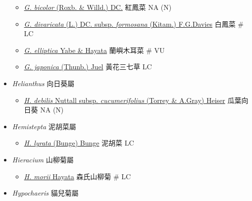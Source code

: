 \begin{itemize}
  \begin{itemize}
        \item[] \href{http://www.theplantlist.org/tpl1.1/search?q=Gynura+bicolor}{\textit{G. bicolor} (Roxb. \& Willd.) DC.}   紅鳳菜   NA (N)
        \item[] \href{http://www.theplantlist.org/tpl1.1/search?q=Gynura+divaricata+subsp.+formosana}{\textit{G. divaricata} (L.) DC. subsp. \textit{formosana} (Kitam.) F.G.Davies}   白鳳菜  \# LC
        \item[] \href{http://www.theplantlist.org/tpl1.1/search?q=Gynura+elliptica}{\textit{G. elliptica} Yabe \& Hayata}   蘭嶼木耳菜  \# VU
        \item[] \href{http://www.theplantlist.org/tpl1.1/search?q=Gynura+japonica}{\textit{G. japonica} (Thunb.) Juel}   黃花三七草   LC
  \end{itemize}
 \item[] \textit{Helianthus} 向日葵屬
                                
  \begin{itemize}
        \item[] \href{http://www.theplantlist.org/tpl1.1/search?q=Helianthus+debilis+subsp.+cucumerifolius}{\textit{H. debilis} Nuttall subsp. \textit{cucumerifolius} (Torrey \& A.Gray) Heiser}   瓜葉向日葵   NA (N)
  \end{itemize}
 \item[] \textit{Hemistepta} 泥胡菜屬
                                
  \begin{itemize}
        \item[] \href{http://www.theplantlist.org/tpl1.1/search?q=Hemistepta+lyrata}{\textit{H. lyrata} (Bunge) Bunge}   泥胡菜   LC
  \end{itemize}
 \item[] \textit{Hieracium} 山柳菊屬
                                
  \begin{itemize}
        \item[] \href{http://www.theplantlist.org/tpl1.1/search?q=Hieracium+morii}{\textit{H. morii} Hayata}   森氏山柳菊  \# LC
  \end{itemize}
 \item[] \textit{Hypochaeris} 貓兒菊屬
                                

\end{itemize}

